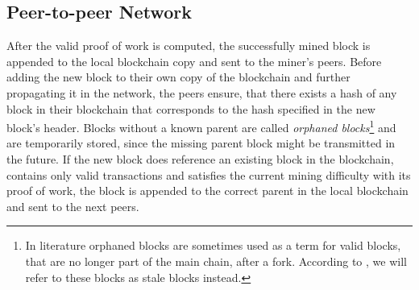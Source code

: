 \documentclass[a4paper,12pt,twoside]{report}
\begin{document}
\subsection{Peer-to-peer Network} \label{peer2peer}
After the valid proof of work is computed, the successfully mined block is appended to the local blockchain copy and sent to the miner's peers. Before adding the new block to their own copy of the blockchain and further propagating it in the network, the peers ensure, that there exists a hash of any block in their blockchain that corresponds to the hash specified in the new block's header. Blocks without a known parent are called \textit{orphaned blocks}\footnote{In literature orphaned blocks are sometimes used as a term for valid blocks, that are no longer part of the main chain, after a fork. According to \cite{staleblocks}, we will refer to these blocks as stale blocks instead.} and are temporarily stored, since the missing parent block might be transmitted in the future. If the new block does reference an existing block in the blockchain, contains only valid transactions and satisfies the current mining difficulty with its proof of work, the block is appended to the correct parent in the local blockchain and sent to the next peers. 
\end{document}
